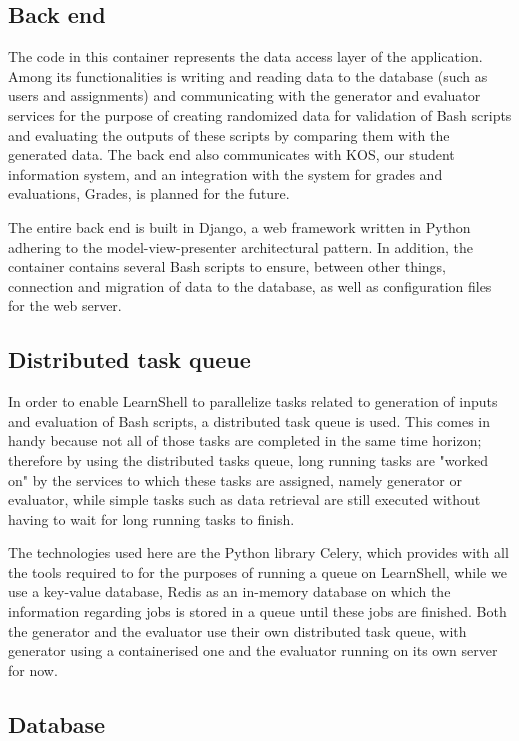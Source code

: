 \documentclass[thesis=B,english]{FITthesis}[2019/12/23]
\begin{document}
\subsection{Back end}

The code in this container represents the data access layer of the application. Among its functionalities is writing and reading data to the database (such as users and assignments) and communicating with the generator and evaluator services for the purpose of creating randomized data for validation of Bash scripts and evaluating the outputs of these scripts by comparing them with the generated data. \cite{learnshell-borsky} The back end also communicates with KOS, our student information system, and an integration with the system for grades and evaluations, Grades, is planned for the future.

The entire back end is built in Django, a web framework written in Python adhering to the model-view-presenter architectural pattern. In addition, the container contains several Bash scripts to ensure, between other things, connection and migration of data to the database, as well as configuration files for the web server.

\subsection{Distributed task queue}

In order to enable LearnShell to parallelize tasks related to generation of inputs and evaluation of Bash scripts, a distributed task queue is used. This comes in handy because not all of those tasks are completed in the same time horizon; therefore by using the distributed tasks queue, long running tasks are "worked on" by the services to which these tasks are assigned, namely generator or evaluator, while simple tasks such as data retrieval are still executed without having to wait for long running tasks to finish.

The technologies used here are the Python library Celery, which provides with all the tools required to for the purposes of running a queue on LearnShell, while we use a key-value database, Redis as an in-memory database on which the information regarding jobs is stored in a queue until these jobs are finished. Both the generator and the evaluator use their own distributed task queue, with generator using a containerised one and the evaluator running on its own server for now.

\subsection{Database}
\end{document}
